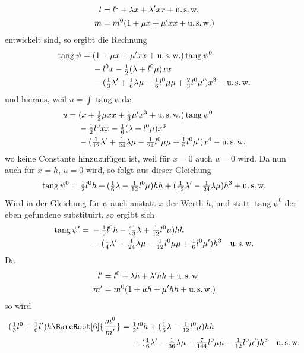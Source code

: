 %
\[
\begin{aligned}
l&=l^0+\lambda x+\lambda'xx+\text{u.\,s.\,w.}\\
m&=m^0(1+\mu x+\mu'xx+\text{u.\,s.\,w.})
\end{aligned}
\]
entwickelt sind, so ergibt die Rechnung
\[
\begin{aligned}
\operatorname{tang}\psi={}&(1+\mu x+\mu'xx+\text{u.\,s.\,w.})\operatorname{tang}\psi^0\\
&-l^0x-\tfrac{1}{2}(\lambda+l^0\mu)xx\\
&-(\tfrac{1}{3}\lambda'+\tfrac{1}{6}\lambda\mu-\tfrac{1}{6}l^0\mu\mu+\tfrac{2}{3}l^0\mu')x^3-\text{u.\,s.\,w.}
\end{aligned}
\]
und hieraus, weil \(u=\int\operatorname{tang}\psi\mathord{.}\mathrm{d}x\)
\[
\begin{aligned}
u={}&(x+\tfrac{1}{2}\mu xx+\tfrac{1}{3}\mu'x^3+\text{u.\,s.\,w.})\operatorname{tang}\psi^0\\
&-\tfrac{1}{2}l^0xx-\tfrac{1}{6}(\lambda+l^0\mu)x^3\\
&-(\tfrac{1}{12}\lambda'+\tfrac{1}{24}\lambda\mu-\tfrac{1}{24}l^0\mu\mu+\tfrac{1}{6}l^0\mu')x^4-\text{u.\,s.\,w.}
\end{aligned}
\]
wo keine Constante hinzuzufügen ist, weil für \(x=0\) auch \(u=0\) wird. Da nun auch für \(x=h\), \(u=0\) wird, so folgt aus dieser Gleichung
\[
\operatorname{tang}\psi^0=\tfrac{1}{2}l^0h+(\tfrac{1}{6}\lambda-\tfrac{1}{12}l^0\mu)hh+(\tfrac{1}{12}\lambda'-\tfrac{1}{24}\lambda\mu)h^3+\text{u.\,s.\,w.}
\]
Wird in der Gleichung für \(\psi\) auch anstatt \(x\) der Werth \(h\), und statt \(\operatorname{tang}\psi^0\) der eben gefundene substituirt, so ergibt sich
\[
\begin{aligned}
\operatorname{tang}\psi'={}&-\tfrac{1}{2}l^0h-(\tfrac{1}{3}\lambda+\tfrac{1}{12}l^0\mu)hh\\
&-(\tfrac{1}{4}\lambda'+\tfrac{1}{24}\lambda\mu-\tfrac{1}{12}l^0\mu\mu+\tfrac{1}{6}l^0\mu')h^3\quad\text{u.\,s.\,w.}
\end{aligned}
\]
Da
\[
\begin{aligned}
l'&=l^0+\lambda h+\lambda'hh+\text{u.\,s.\,w}\\
m'&=m^0(1+\mu h+\mu'hh+\text{u.\,s.\,w.})
\end{aligned}
\]
so wird
\[
\begin{aligned}
(\tfrac{1}{3}l^0+\tfrac{1}{6}l')h\BareRoot[6]{\frac{m^0}{m'}}={}&\tfrac{1}{2}l^0h+(\tfrac{1}{6}\lambda-\tfrac{1}{12}l^0\mu)hh\\
&+(\tfrac{1}{6}\lambda'-\tfrac{1}{36}\lambda\mu+\tfrac{7}{144}l^0\mu\mu-\tfrac{1}{12}l^0\mu')h^3\quad\text{u.\,s.\,w.}
\end{aligned}
\]

